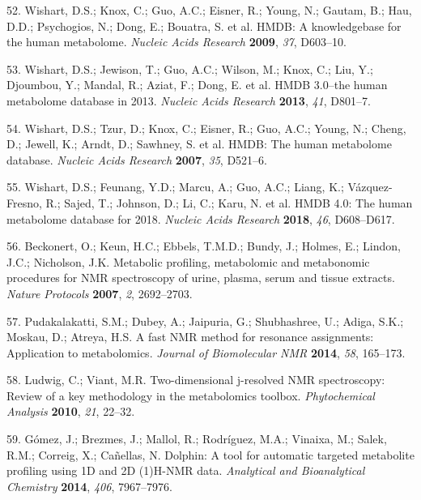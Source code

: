 \documentclass[]{article}
\begin{document}
\leavevmode\hypertarget{ref-wishart_2009}{}%
52. Wishart, D.S.; Knox, C.; Guo, A.C.; Eisner, R.; Young, N.; Gautam, B.; Hau, D.D.; Psychogios, N.; Dong, E.; Bouatra, S. et al. HMDB: A knowledgebase for the human metabolome. \emph{Nucleic Acids Research} \textbf{2009}, \emph{37}, D603--10.

\leavevmode\hypertarget{ref-wishart_2013}{}%
53. Wishart, D.S.; Jewison, T.; Guo, A.C.; Wilson, M.; Knox, C.; Liu, Y.; Djoumbou, Y.; Mandal, R.; Aziat, F.; Dong, E. et al. HMDB 3.0--the human metabolome database in 2013. \emph{Nucleic Acids Research} \textbf{2013}, \emph{41}, D801--7.

\leavevmode\hypertarget{ref-wishart_2007}{}%
54. Wishart, D.S.; Tzur, D.; Knox, C.; Eisner, R.; Guo, A.C.; Young, N.; Cheng, D.; Jewell, K.; Arndt, D.; Sawhney, S. et al. HMDB: The human metabolome database. \emph{Nucleic Acids Research} \textbf{2007}, \emph{35}, D521--6.

\leavevmode\hypertarget{ref-wishart_2018}{}%
55. Wishart, D.S.; Feunang, Y.D.; Marcu, A.; Guo, A.C.; Liang, K.; Vázquez-Fresno, R.; Sajed, T.; Johnson, D.; Li, C.; Karu, N. et al. HMDB 4.0: The human metabolome database for 2018. \emph{Nucleic Acids Research} \textbf{2018}, \emph{46}, D608--D617.

\leavevmode\hypertarget{ref-beckonert_2007}{}%
56. Beckonert, O.; Keun, H.C.; Ebbels, T.M.D.; Bundy, J.; Holmes, E.; Lindon, J.C.; Nicholson, J.K. Metabolic profiling, metabolomic and metabonomic procedures for NMR spectroscopy of urine, plasma, serum and tissue extracts. \emph{Nature Protocols} \textbf{2007}, \emph{2}, 2692--2703.

\leavevmode\hypertarget{ref-pudakalakatti_2014}{}%
57. Pudakalakatti, S.M.; Dubey, A.; Jaipuria, G.; Shubhashree, U.; Adiga, S.K.; Moskau, D.; Atreya, H.S. A fast NMR method for resonance assignments: Application to metabolomics. \emph{Journal of Biomolecular NMR} \textbf{2014}, \emph{58}, 165--173.

\leavevmode\hypertarget{ref-ludwig_2010}{}%
58. Ludwig, C.; Viant, M.R. Two-dimensional j-resolved NMR spectroscopy: Review of a key methodology in the metabolomics toolbox. \emph{Phytochemical Analysis} \textbf{2010}, \emph{21}, 22--32.

\leavevmode\hypertarget{ref-gmez_2014}{}%
59. Gómez, J.; Brezmes, J.; Mallol, R.; Rodríguez, M.A.; Vinaixa, M.; Salek, R.M.; Correig, X.; Cañellas, N. Dolphin: A tool for automatic targeted metabolite profiling using 1D and 2D (1)H-NMR data. \emph{Analytical and Bioanalytical Chemistry} \textbf{2014}, \emph{406}, 7967--7976.
\end{document}
